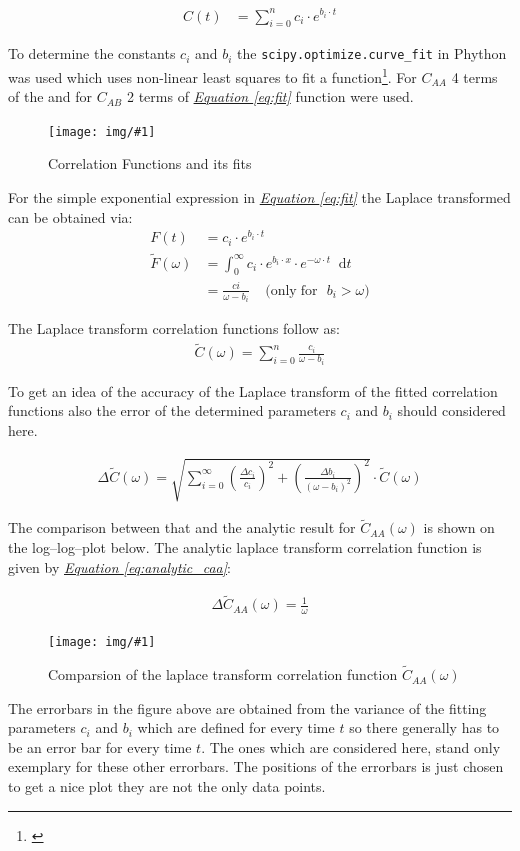 \documentclass[a4paper, parskip=half]{scrartcl}
\newcommand{\myImage}[2]{
	\begin{figure}[H]
	\centering
	\texttt{[image: img/\#1]}
	\caption{#2}
	\label{pic:#1}
	\end{figure}
}
\newcommand{\diff}{\mathop{}\!\mathrm{d}}
\newcommand{\myEqRef}[1]{\textit{\hyperref[eq:#1]{Equation \ref*{eq:#1}}}}
\newcommand{\myEqLabel}[1]{\label{eq:#1}}
\newcommand{\myCite}[1]{\footnote{\cite{#1} \citeauthor{#1} \citetitle{#1} \citeyear{#1}}}
\begin{document}
\begin{align}
C(t) &= \sum_{i=0}^{n} c_i \cdot e^{b_i \cdot t} \myEqLabel{fit}
\end{align}

To determine the constants $c_i$ and $b_i$ the \verb+scipy.optimize.curve_fit+ in Phython was used which uses non-linear least squares to fit a function\myCite{curvefit}. For $C_{AA}$ 4 terms of the and for $C_{AB}$ 2 terms of \myEqRef{fit} function were used.

\myImage{caa_cab}{Correlation Functions and its fits}

For the simple exponential expression in \myEqRef{fit} the Laplace transformed can be obtained via:
\begin{align}
F(t) &= c_i \cdot e^{b_i \cdot t} \\
\widetilde{F}(\omega) &= \int_0^\infty c_i \cdot e^{b_i\cdot x} \cdot e^{-\omega\cdot t}\diff t \\
&= \frac{ci}{\omega - b_i}\;\;\;\; \mathrm{(only\; for\,\,\,\, } b_i > \omega \mathrm{)} \myEqLabel{laplace}
\end{align}

The Laplace transform correlation functions follow as:
\begin{align}
\widetilde{C}(\omega) = \sum_{i=0}^n \frac{c_i}{\omega - b_i}
\end{align}

To get an idea of the accuracy of the Laplace transform of the fitted correlation functions also the error of the determined parameters $c_i$ and $b_i$ should considered here.

\begin{align}
\Delta\widetilde{C}(\omega) = \sqrt{\sum_{i=0}^\infty \left(\frac{\Delta c_i}{c_i} \right)^2 + \left( \frac{\Delta b_i}{(\omega - b_i)^2}\right)^2} \cdot \widetilde{C}(\omega)
\end{align}

The comparison between that and the analytic result for $\widetilde{C}_{AA}(\omega)$ is shown on the log--log--plot below. The analytic laplace transform correlation function is given by \myEqRef{analytic_caa}:

\begin{align}
\Delta\widetilde{C}_{AA}(\omega) = \frac{1}{\omega}
\end{align}

\myImage{compare_lac}{Comparsion of the laplace transform correlation function $\widetilde{C}_{AA}(\omega)$}

The errorbars in the figure above are obtained from the variance of the fitting parameters $c_i$ and $b_i$ which are defined for every time $t$ so there generally has to be an error bar for every time $t$. The ones which are considered here, stand only exemplary for these other errorbars. The positions of the errorbars is just chosen to get a nice plot they are not the only data points. 
\end{document}
